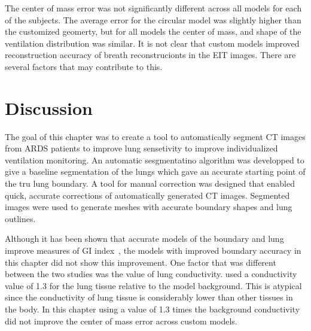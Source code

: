 The center of mass error was not significantly different across all models for each of the subjects. 
The average error for the circular model was slightly higher than the customized geomerty, but for 
all models the center of mass, and shape of the ventilation distribution was similar. It is not clear 
that custom models improved reconstruction accuracy of breath reconstrucionts in the EIT images. 
There are several factors that may contribute to this. 

\section{Discussion}
The goal of this chapter was to create a tool to automatically segment CT images from ARDS patients 
to improve lung sensetivity to improve individualized ventilation monitoring. 
An automatic sesgmentatino algorithm was developped to give a baseline segmentation of the lungs which 
gave an accurate starting point of the tru lung boundary. A tool for manual correction was designed 
that enabled quick, accurate corrections of automatically generated CT images. 
Segmented images were used to generate meshes with accurate boundary  shapes and lung outlines. 

Although it has been shown that accurate models of the boundary and lung improve measures of
GI index~\parencite{yang_lung_2021}, the models with improved boundary accuracy in this chapter 
did not show this improvement. One factor that was different between the two studies was the value 
of lung conductivity.  used a conductivity value of 1.3 for the lung 
tissue relative to the model background. This is atypical since the conductivity of lung tissue is 
considerably lower than other tissues in the body. In this chapter using a value of 
1.3 times the background 
conductivity did not improve the center of mass error across custom models.

